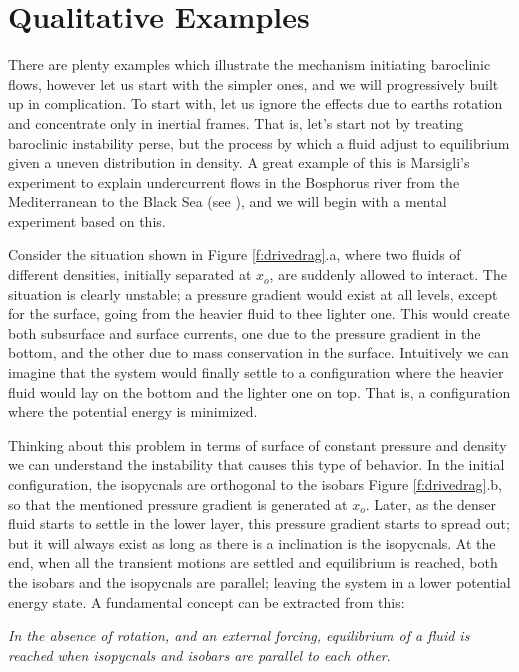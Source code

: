 \section{Qualitative Examples}
\label{s:examples}
There are plenty examples which illustrate the mechanism initiating baroclinic flows, however let us start with the simpler ones, and we will progressively built up in complication. To start with, let us ignore the effects due to earths rotation and concentrate only in inertial frames. That is, let's start not by treating baroclinic instability perse, but the process by which a fluid adjust to equilibrium given a uneven distribution in density. A great example of this is Marsigli's experiment to explain undercurrent flows in the Bosphorus river from the Mediterranean to the Black Sea (see ), and we will begin with a mental experiment based on this.

Consider the situation shown in Figure \ref{f:drivedrag}.a, where two fluids of different densities, initially separated at $x_o$, are suddenly allowed to interact. The situation is clearly unstable; a pressure gradient would exist at all levels, except for the surface, going from the heavier fluid to thee lighter one. This would create both subsurface and surface currents, one due to the pressure gradient in the bottom, and the other due to mass conservation in the surface. Intuitively we can imagine that the system would finally settle to a configuration where the heavier fluid would lay on the bottom and the lighter one on top. That is, a configuration where the potential energy is minimized.

Thinking about this problem in terms of surface of constant pressure and density we can understand the instability that causes this type of behavior. In the initial configuration, the isopycnals are orthogonal to the isobars Figure \ref{f:drivedrag}.b, so that the mentioned pressure gradient is generated at $x_o$. Later, as the denser fluid starts to settle in the lower layer, this pressure gradient starts to spread out; but it will always exist as long as there is a inclination is the isopycnals. At the end, when all the transient motions are settled and equilibrium is reached, both  the isobars and the isopycnals are parallel; leaving the system in a lower potential energy state. A fundamental concept can be extracted from this: 

\emph{In the absence of rotation, and an external forcing, equilibrium of a fluid is reached when isopycnals and isobars are parallel to each other}. 


